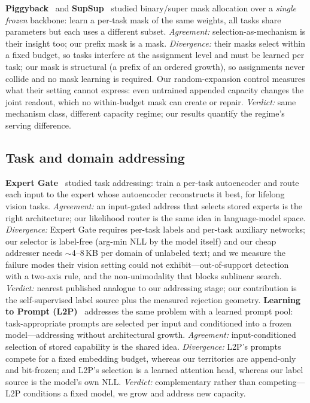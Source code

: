 \documentclass[11pt]{article}
\theoremstyle{definition}\newtheorem{definition}{Definition}
\theoremstyle{remark}\newtheorem{remark}{Remark}
\begin{document}
\textbf{Piggyback}~\cite{piggyback} and \textbf{SupSup}~\cite{supsup} studied
binary/super mask allocation over a \emph{single frozen} backbone: learn a per-task mask
of the same weights, all tasks share parameters but each uses a different subset.
\emph{Agreement:} selection-as-mechanism is their insight too; our prefix mask is a
mask. \emph{Divergence:} their masks select within a fixed budget, so tasks interfere at
the assignment level and must be learned per task; our mask is structural (a prefix of an
ordered growth), so assignments never collide and no mask learning is required. Our
random-expansion control measures what their setting cannot express: even untrained
appended capacity changes the joint readout, which no within-budget mask can create or
repair. \emph{Verdict:} same mechanism class, different capacity regime; our results
quantify the regime's serving difference.

\subsection{Task and domain addressing}
\label{sec:prior:addressing}

\textbf{Expert Gate}~\cite{expertgate} studied task addressing: train a per-task
autoencoder and route each input to the expert whose autoencoder reconstructs it best,
for lifelong vision tasks. \emph{Agreement:} an input-gated address that selects stored
experts is the right architecture; our likelihood router is the same idea in language-model
space. \emph{Divergence:} Expert Gate requires per-task labels and per-task auxiliary
networks; our selector is label-free (arg-min NLL by the model itself) and our cheap
addresser needs $\sim$4--8\,KB per domain of unlabeled text; and we measure the failure
modes their vision setting could not exhibit---out-of-support detection with a two-axis
rule, and the non-unimodality that blocks sublinear search. \emph{Verdict:} nearest
published analogue to our addressing stage; our contribution is the self-supervised label
source plus the measured rejection geometry. \textbf{Learning to Prompt (L2P)}~\cite{l2p} addresses the same problem with a learned prompt pool: task-appropriate prompts are selected per input and conditioned into a frozen model---addressing without architectural growth. \emph{Agreement:} input-conditioned selection of stored capability is the shared idea. \emph{Divergence:} L2P's prompts compete for a fixed embedding budget, whereas our territories are append-only and bit-frozen; and L2P's selection is a learned attention head, whereas our label source is the model's own NLL. \emph{Verdict:} complementary rather than competing---L2P conditions a fixed model, we grow and address new capacity.
\end{document}
